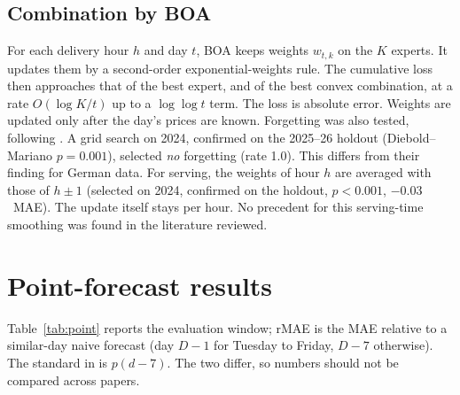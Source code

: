 \documentclass[11pt,a4paper]{article}
\begin{document}
\subsection{Combination by BOA}
For each delivery hour $h$ and day $t$, BOA \citep{wintenberger2017} keeps weights $w_{t,k}$ on the $K$ experts. It updates them by a second-order exponential-weights rule. The cumulative loss then approaches that of the best expert, and of the best convex combination, at a rate $O(\log K / t)$ up to a $\log\log t$ term. The loss is absolute error. Weights are updated only after the day's prices are known. Forgetting was also tested, following \citet{berrisch2024}. A grid search on 2024, confirmed on the 2025--26 holdout (Diebold--Mariano $p=0.001$), selected \emph{no} forgetting (rate 1.0). This differs from their finding for German data. For serving, the weights of hour $h$ are averaged with those of $h\pm1$ (selected on 2024, confirmed on the holdout, $p<0.001$, $-0.03$~MAE). The update itself stays per hour. No precedent for this serving-time smoothing was found in the literature reviewed.

\section{Point-forecast results}

Table~\ref{tab:point} reports the evaluation window; rMAE is the MAE relative to a similar-day naive forecast (day $D\!-\!1$ for Tuesday to Friday, $D\!-\!7$ otherwise). The standard in \citet{lago2021} is $p(d\!-\!7)$. The two differ, so numbers should not be compared across papers.
\end{document}
